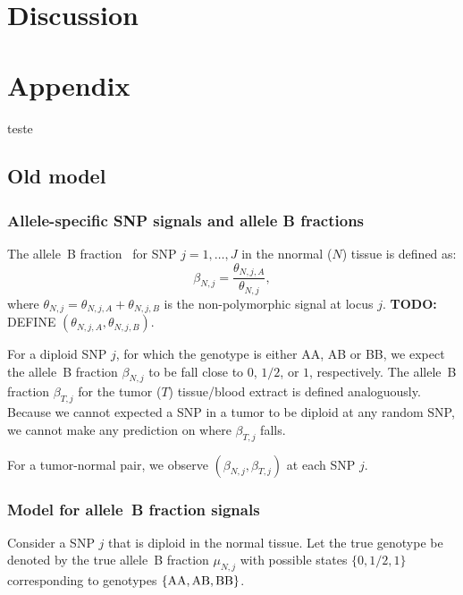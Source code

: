 \documentclass[draft]{bioinfo}
\newcommand{\gAA}{\textnormal{AA}\xspace}
\newcommand{\gAB}{\textnormal{AB}\xspace}
\newcommand{\gBB}{\textnormal{BB}\xspace}
\newenvironment{TODO}{\color{red}\textbf{TODO:}}{}
\begin{document}
\section{Discussion}
\label{secDiscussion}

\section{Appendix}
teste
\subsection{Old model}
\label{sec:old-model}

\subsubsection{Allele-specific SNP signals and allele B fractions}
The allele~B fraction~\cite{PeifferD_etal_2006} for SNP $j=1,\ldots,J$ in the nnormal ($N$) tissue is defined as:
\begin{equation}
  \beta_{N,j} = \frac{\theta_{N,j,A}}{\theta_{N,j}},
  \label{eqnCnLogRatio}
\end{equation}
where $\theta_{N,j} = \theta_{N,j,A} + \theta_{N,j,B}$ is the non-polymorphic signal at locus $j$.
\begin{TODO}
  DEFINE $(\theta_{N,j,A}, \theta_{N,j,B})$.
\end{TODO}

For a diploid SNP $j$, for which the genotype is either AA, AB or BB, we expect the allele~B fraction $\beta_{N,j}$ to be fall close to $0$, $1/2$, or $1$, respectively.
The allele~B fraction $\beta_{T,j}$ for the tumor ($T$) tissue/blood extract is defined analoguously. Because we cannot expected a SNP in a tumor to be diploid at any random SNP, we cannot make any prediction on where $\beta_{T,j}$ falls.

For a tumor-normal pair, we observe $(\beta_{N,j}, \beta_{T,j})$ at each SNP $j$.

\subsubsection{Model for allele~B fraction signals}
Consider a SNP $j$ that is diploid in the normal tissue.  
Let the true genotype be denoted by the true allele~B fraction $\mu_{N,j}$ with possible states $\{0,1/2,1\}$ corresponding to genotypes $\{\gAA,\gAB,\gBB\}$.
\end{document}
